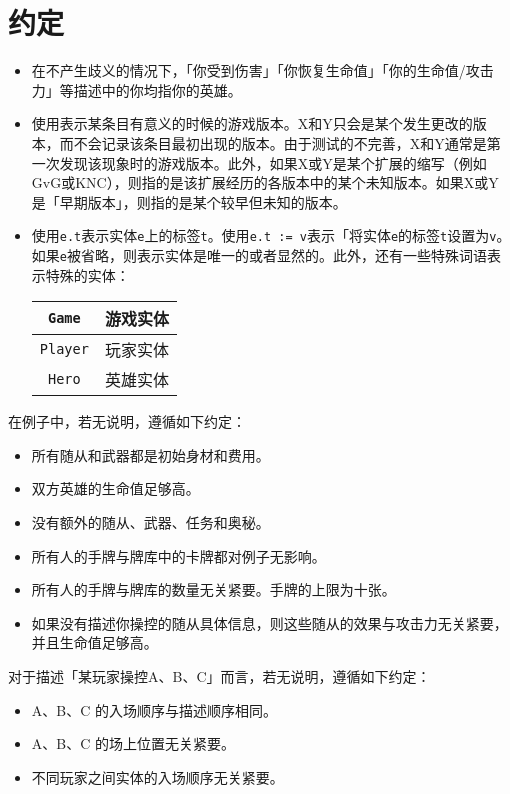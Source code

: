 \chapter{约定}

\begin{itemize}
    \item 在不产生歧义的情况下，「你受到伤害」「你恢复生命值」「你的生命值/攻击力」等描述中的你均指你的英雄。
    \item 使用表示某条目有意义的时候的游戏版本。X和Y只会是某个发生更改的版本，而不会记录该条目最初出现的版本。由于测试的不完善，X和Y通常是第一次发现该现象时的游戏版本。此外，如果X或Y是某个扩展的缩写（例如GvG或KNC），则指的是该扩展经历的各版本中的某个未知版本。如果X或Y是「早期版本」，则指的是某个较早但未知的版本。
    \item 使用\texttt{e.t}表示实体\texttt{e}上的标签\texttt{t}。使用\texttt{e.t := v}表示「将实体\texttt{e}的标签\texttt{t}设置为\texttt{v}。如果\texttt{e}被省略，则表示实体是唯一的或者显然的。此外，还有一些特殊词语表示特殊的实体：\\
        \begin{center}
            \begin{tabular}{|c|c|}
                \hline
                \texttt{Game} & 游戏实体 \\
                \hline
                \texttt{Player} & 玩家实体 \\
                \hline
                \texttt{Hero} & 英雄实体 \\
                \hline
            \end{tabular}
        \end{center}
\end{itemize}

在例子中，若无说明，遵循如下约定：

\begin{itemize}
    \item 所有随从和武器都是初始身材和费用。
    \item 双方英雄的生命值足够高。
    \item 没有额外的随从、武器、任务和奥秘。
    \item 所有人的手牌与牌库中的卡牌都对例子无影响。
    \item 所有人的手牌与牌库的数量无关紧要。手牌的上限为十张。
    \item 如果没有描述你操控的随从具体信息，则这些随从的效果与攻击力无关紧要，并且生命值足够高。
\end{itemize}

对于描述「某玩家操控A、B、C」而言，若无说明，遵循如下约定：

\begin{itemize}
    \item A、B、C 的入场顺序与描述顺序相同。
    \item A、B、C 的场上位置无关紧要。
    \item 不同玩家之间实体的入场顺序无关紧要。
\end{itemize}
